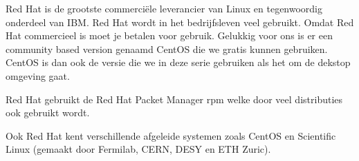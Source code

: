 Red Hat is de grootste commerci\"ele leverancier van Linux en tegenwoordig onderdeel van IBM. Red Hat wordt in het
bedrijfsleven veel gebruikt. Omdat Red Hat commercieel is moet je betalen voor gebruik. Gelukkig voor ons is er een
community based version genaamd CentOS die we gratis kunnen gebruiken. CentOS is dan ook de versie die we in deze serie gebruiken als het om de dekstop omgeving gaat.

Red Hat gebruikt de Red Hat Packet Manager rpm welke door veel distributies ook gebruikt wordt.

Ook Red Hat kent verschillende afgeleide systemen zoals CentOS en Scientific Linux (gemaakt door Fermilab, CERN, DESY en ETH Zuric).
